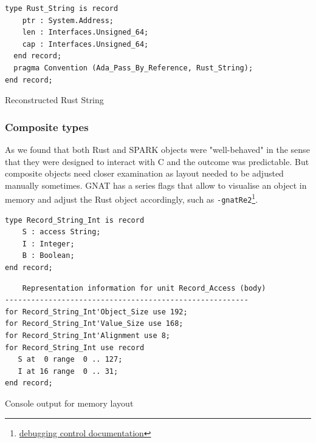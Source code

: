 \documentclass[nomenclature, english, bibtex]{kththesis}
\newcommand{\inlinecode}[1]{\texttt{#1}}
\begin{document}
\begin{listing}[!ht]
\begin{verbatim}
type Rust_String is record
    ptr : System.Address;
    len : Interfaces.Unsigned_64;
    cap : Interfaces.Unsigned_64;
  end record;
  pragma Convention (Ada_Pass_By_Reference, Rust_String);
end record;
\end{verbatim}
\caption[Reconstructed Rust String]{Reconstructed Rust String}
\label{lst:reconstructed_rust_string}
\end{listing}
\FloatBarrier


\subsubsection{Composite types}

As we found that both Rust and SPARK objects were "well-behaved" in the sense that they  were designed to interact with C and the outcome was predictable. But composite objects need closer examination as layout needed to be adjusted manually sometimes.
GNAT has a series flags that allow to visualise an object in memory and adjust the Rust object accordingly, such as \inlinecode{-gnatRe2}\footnote{\href{https://docs.adacore.com/gnat_ugn-docs/html/gnat_ugn/gnat_ugn/building_executable_programs_with_gnat.html}{debugging control documentation}}. 

\begin{listing}[!ht]
\begin{verbatim}
type Record_String_Int is record
    S : access String;
    I : Integer;
    B : Boolean;
end record;
\end{verbatim}
\end{listing}

\begin{listing}[!ht]
\begin{verbatim}
    Representation information for unit Record_Access (body)
--------------------------------------------------------
for Record_String_Int'Object_Size use 192;
for Record_String_Int'Value_Size use 168;
for Record_String_Int'Alignment use 8;
for Record_String_Int use record
   S at  0 range  0 .. 127;
   I at 16 range  0 .. 31;
end record;
\end{verbatim}
\caption[mem layout output]{Console output for memory layout}
\label{lst:gnatrj}
\end{listing}
\end{document}
